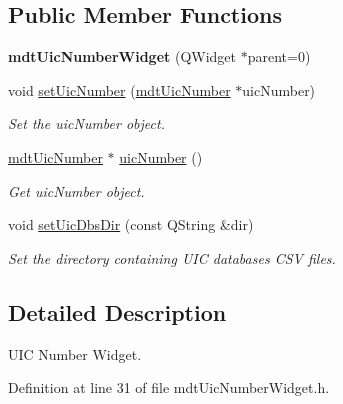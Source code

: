 \subsection*{Public Member Functions}
\begin{DoxyCompactItemize}
\item 
\hypertarget{classmdt_uic_number_widget_a1742d3d2c2f697098a8ecc7b2c87d644}{
{\bfseries mdtUicNumberWidget} (QWidget $\ast$parent=0)}
\label{classmdt_uic_number_widget_a1742d3d2c2f697098a8ecc7b2c87d644}

\item 
void \hyperlink{classmdt_uic_number_widget_a8555bdd4ce7050ef9a516d33625200e0}{setUicNumber} (\hyperlink{classmdt_uic_number}{mdtUicNumber} $\ast$uicNumber)
\begin{DoxyCompactList}\small\item\em Set the uicNumber object. \end{DoxyCompactList}\item 
\hyperlink{classmdt_uic_number}{mdtUicNumber} $\ast$ \hyperlink{classmdt_uic_number_widget_a3d2d6790e043f48d59a63eef7341fd99}{uicNumber} ()
\begin{DoxyCompactList}\small\item\em Get uicNumber object. \end{DoxyCompactList}\item 
\hypertarget{classmdt_uic_number_widget_a1ca77bc9c81ba3aa8ad4205186b05114}{
void \hyperlink{classmdt_uic_number_widget_a1ca77bc9c81ba3aa8ad4205186b05114}{setUicDbsDir} (const QString \&dir)}
\label{classmdt_uic_number_widget_a1ca77bc9c81ba3aa8ad4205186b05114}

\begin{DoxyCompactList}\small\item\em Set the directory containing UIC databases CSV files. \end{DoxyCompactList}\end{DoxyCompactItemize}


\subsection{Detailed Description}
UIC Number Widget. 

Definition at line 31 of file mdtUicNumberWidget.h.



